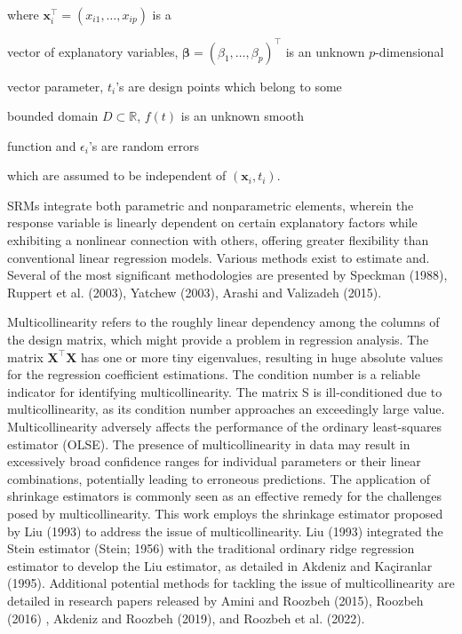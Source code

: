 \documentclass[10pt,twoside]{article}
\numberwithin{equation}{section}
\begin{document}
where {$\boldsymbol x_i^\top=(x_{i1},\ldots, x_{ip})$} is a

vector of explanatory variables, $\boldsymbol \beta=

(\beta_1,\ldots,\beta_p)^\top$ is an unknown $p$-dimensional

vector parameter, $t_i$'s are  design points which belong to some

bounded domain $D\subset \mathbb{R}$, $f(t)$ is an unknown smooth

function and $\epsilon_i$'s  are random errors

which are assumed to be independent of $(\boldsymbol x_i,t_i)$.



SRMs integrate both parametric and nonparametric elements, wherein the response variable is linearly dependent on certain explanatory factors while exhibiting a nonlinear connection with others, offering greater flexibility than conventional linear regression models. Various methods exist to estimate and. Several of the most significant methodologies are presented by Speckman (1988), Ruppert et al. (2003), Yatchew (2003), Arashi and Valizadeh (2015).









Multicollinearity refers to the roughly linear dependency among the columns of the design matrix, which might provide a problem in regression analysis. The matrix $\boldsymbol{X}^\top\boldsymbol{X}$  has one or more tiny eigenvalues, resulting in huge absolute values for the regression coefficient estimations. The condition number is a reliable indicator for identifying multicollinearity. The matrix S is ill-conditioned due to multicollinearity, as its condition number approaches an exceedingly large value. Multicollinearity adversely affects the performance of the ordinary least-squares estimator (OLSE). The presence of multicollinearity in data may result in excessively broad confidence ranges for individual parameters or their linear combinations, potentially leading to erroneous predictions. The application of shrinkage estimators is commonly seen as an effective remedy for the challenges posed by multicollinearity. This work employs the shrinkage estimator proposed by Liu (1993) to address the issue of multicollinearity. Liu (1993) integrated the Stein estimator (Stein; 1956) with the traditional ordinary ridge regression estimator to develop the Liu estimator, as detailed in Akdeniz and Kaçiranlar (1995). Additional potential methods for tackling the issue of multicollinearity are detailed in research papers released by Amini and Roozbeh (2015), Roozbeh (2016) , Akdeniz and Roozbeh (2019), and Roozbeh et al. (2022).
\end{document}

